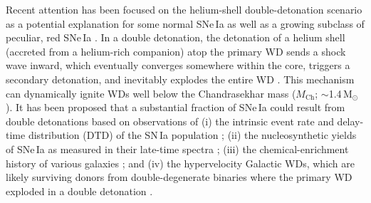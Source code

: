 \documentclass[twocolumn]{aastex631}
\newcommand{\Mch}{$M_\mathrm{Ch}$}
\newcommand{\chang}[1]{\textcolor{blue}{[Chang: #1]}}
\begin{document}
\begin{CJK*}{UTF8}{gbsn}
Recent attention has been focused on the helium-shell double-detonation scenario as a potential explanation for some normal SNe\,Ia \citep[e.g.,][]{polin_observational_2019,Shen_2D_2021} as well as a growing subclass of peculiar, red SNe\,Ia \citep[e.g.,][]{jiang_16jhr_2017, de_18byg_2019,Liu_20jgb_2023}. In a double detonation, the detonation of a helium shell (accreted from a helium-rich companion) atop the primary WD sends a shock wave inward, %
which eventually converges somewhere within the core, triggers a secondary detonation, and inevitably explodes the entire WD \citep{Nomoto_1982a,Nomoto_1982b,Woosley_1986,Livne_1990,Woosley_1994,Livne_1995}. This mechanism can dynamically ignite WDs well below the Chandrasekhar mass (\Mch; $\sim$1.4\,$\mathrm{M_\odot}$). It has been proposed that a substantial fraction of SNe\,Ia could result from double detonations based on observations of (i) the intrinsic event rate and delay-time distribution (DTD) of the SN\,Ia population \citep{Ruiter_2011,Ruiter_2014}; (ii) the nucleosynthetic yields of SNe\,Ia as measured in their late-time spectra \citep{Maguire_2018,Flors_2020}; (iii) the chemical-enrichment history of various galaxies \citep{Kirby_2019,de_los_reyes_manganese_2020,Sanders_2021,Eitner_2022}; and (iv) the hypervelocity Galactic WDs, which are likely surviving donors from double-degenerate binaries where the primary WD exploded in a double detonation \citep{Shen_2018,El-Badry_2023}.


\end{CJK*}
\end{document}
